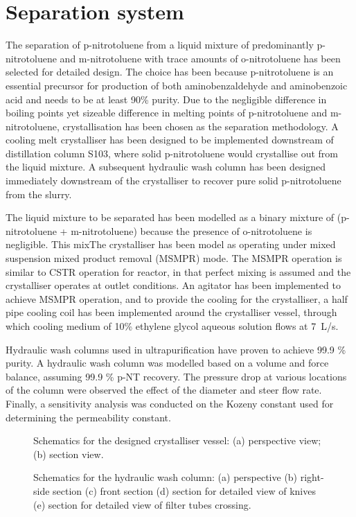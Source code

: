 \section*{Separation system}

The separation of p-nitrotoluene from a liquid mixture of predominantly p-nitrotoluene and m-nitrotoluene with trace amounts of o-nitrotoluene has been selected for detailed design. The choice has been because p-nitrotoluene is an essential precursor for production of both aminobenzaldehyde and aminobenzoic acid and needs to be at least 90\% purity. Due to the negligible difference in boiling points yet sizeable difference in melting points of p-nitrotoluene and m-nitrotoluene, crystallisation has been chosen as the separation methodology. A cooling melt crystalliser has been designed to be implemented downstream of distillation column S103, where solid p-nitrotoluene would crystallise out from the liquid mixture. A subsequent hydraulic wash column has been designed immediately downstream of the crystalliser to recover pure solid p-nitrotoluene from the slurry. 


The liquid mixture to be separated has been modelled as a binary mixture of (p-nitrotoluene + m-nitrotoluene) because the presence of o-nitrotoluene is negligible. This mixThe crystalliser has been model as operating under mixed suspension mixed product removal (MSMPR) mode. The MSMPR operation is similar to CSTR operation for reactor, in that perfect mixing is assumed and the crystalliser operates at outlet conditions. An agitator has been implemented to achieve MSMPR operation, and to provide the cooling for the crystalliser, a half pipe cooling coil has been implemented around the crystalliser vessel, through which cooling medium of 10\% ethylene glycol aqueous solution flows at \SI{7}{L/s}. 


Hydraulic wash columns used in ultrapurification have proven to achieve 99.9 \% purity. A hydraulic wash column was modelled based on a volume and force balance, assuming 99.9 \% p-NT recovery. The pressure drop at various locations of the column were observed the effect of the diameter and steer flow rate. Finally, a sensitivity analysis was conducted on the Kozeny constant used for determining the permeability constant. 

\begin{figure}[h]
    \centering
    
    \caption{Schematics for the designed crystalliser vessel: (a) perspective view; (b) section view.}
    \label{fig:crystalliser schematic executive}
\end{figure}

\begin{figure}[h]
    \centering
    
    \caption{Schematics for the hydraulic wash column: (a) perspective (b) right-side section (c) front section (d) section for detailed view of knives (e) section for detailed view of filter tubes crossing.}
    \label{fig:wash column schematic executive}
\end{figure}